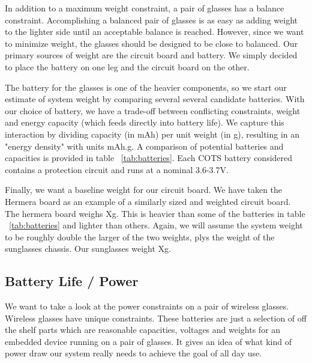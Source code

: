 In addition to a maximum weight constraint, a pair of glasses has a balance constraint.  Accomplishing a balanced pair of glasses is as easy as adding weight to the lighter side until an acceptable balance is reached.  However, since we want to minimize weight, the glasses should be designed to be close to balanced.  Our primary sources of weight are the circuit board and battery.  We simply decided to place the battery on one leg and the circuit board on the other.

The battery for the glasses is one of the heavier components, so we start our estimate of system weight by comparing several several candidate batteries.  With our choice of battery, we have a trade-off between conflicting constraints, weight and energy capacity (which feeds directly into battery life).  We capture this interaction by dividing capacity (in mAh) per unit weight (in g), resulting in an "energy density" with units mAh.g.  A comparison of potential batteries and capacities is provided in table ~\ref{tab:batteries}.  Each COTS battery considered contains a protection circuit and runs at a nominal 3.6-3.7V.

Finally, we want a baseline weight for our circuit board.  We have taken the Hermera board as an example of a similarly sized and weighted circuit board.  The hermera board weighs Xg.  This is heavier than some of the batteries in table ~\ref{tab:batteries} and lighter than others.  Again, we will assume the system weight to be roughly double the larger of the two weights, plys the weight of the sunglasses chassis.  Our sunglasses weight Xg.

\subsection{Battery Life / Power}

%


We want to take a look at the power constraints on a pair of wireless glasses.  Wireless glasses have unique constraints.  These batteries are just a selection of off the shelf parts which are reasonable capacities, voltages and weights for an embedded device running on a pair of glasses.  It gives an idea of what kind of power draw our system really needs to achieve the goal of all day use.

